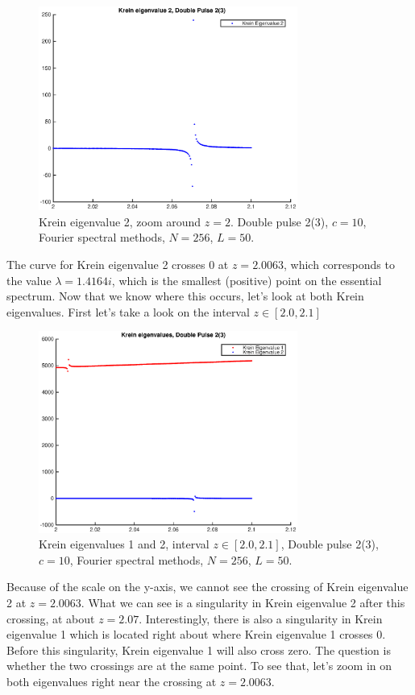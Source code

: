 \documentclass[12pt]{article}
\begin{document}
\begin{figure}[H]
	\includegraphics[width=8.5cm]{dp2kreineigzoomsing2.eps}
	\caption{Krein eigenvalue 2, zoom around $z = 2$. Double pulse 2(3), $c = 10$, Fourier spectral methods, $N =  256$, $L = 50$. }
\end{figure}

The curve for Krein eigenvalue 2 crosses 0 at $z = 2.0063$, which corresponds to the value $\lambda = 1.4164i$, which is the smallest (positive) point on the essential spectrum. Now that we know where this occurs, let's look at both Krein eigenvalues. First let's take a look on the interval $z \in [2.0, 2.1]$

\begin{figure}[H]
	\includegraphics[width=8.5cm]{dp2kreineigsingnear2.eps}
	\caption{Krein eigenvalues 1 and 2, interval $z \in [2.0, 2.1]$, Double pulse 2(3), $c = 10$, Fourier spectral methods, $N = 256$, $L = 50$. }
\end{figure}

Because of the scale on the y-axis, we cannot see the crossing of Krein eigenvalue 2 at $z = 2.0063$. What we can see is a singularity in Krein eigenvalue 2 after this crossing, at about $z = 2.07$. Interestingly, there is also a singularity in Krein eigenvalue 1 which is located right about where Krein eigenvalue 1 crosses 0. Before this singularity, Krein eigenvalue 1 will also cross zero. The question is whether the two crossings are at the same point. To see that, let's zoom in on both eigenvalues right near the crossing at $z = 2.0063$.
\end{document}
